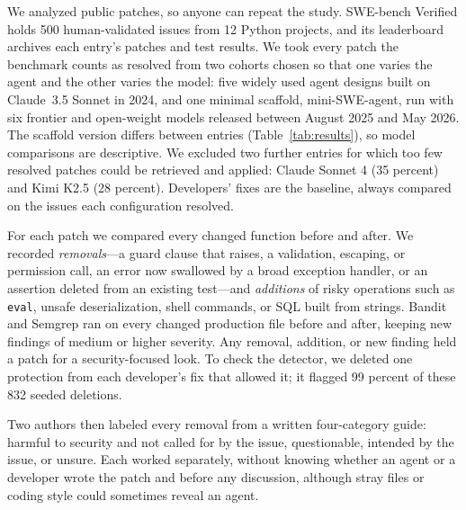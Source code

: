 \documentclass[10pt,journal,compsoc]{IEEEtran}
\begin{document}
We analyzed public patches, so anyone can repeat the study. SWE-bench Verified
holds 500 human-validated issues from 12 Python projects,\cite{chowdhury2024verified}
and its leaderboard archives each entry's patches and test results.\cite{swebench2026experiments}
We took every patch the benchmark counts as resolved from two cohorts chosen so
that one varies the agent and the other varies the model: five widely used
agent designs built on Claude~3.5 Sonnet in 2024, and one minimal scaffold,
mini-SWE-agent,\cite{yang2024sweagent} run with six frontier and open-weight
models released between August 2025 and May 2026. The scaffold version differs
between entries (Table~\ref{tab:results}), so model comparisons are descriptive.
We excluded two further entries for which too few resolved patches could be
retrieved and applied: Claude Sonnet 4 (35 percent) and Kimi K2.5 (28 percent).
Developers' fixes are the baseline, always compared on the issues each
configuration resolved.

For each patch we compared every changed function before and after. We recorded
\emph{removals}---a guard clause that raises, a validation, escaping, or
permission call, an error now swallowed by a broad exception handler, or an
assertion deleted from an existing test---and \emph{additions} of risky
operations such as \texttt{eval}, unsafe deserialization, shell commands, or SQL
built from strings. Bandit and Semgrep ran on every changed production file
before and after, keeping new findings of medium or higher severity. Any
removal, addition, or new finding held a patch for a security-focused look. To
check the detector, we deleted one protection from each developer's fix that
allowed it; it flagged 99 percent of these 832 seeded deletions.

Two authors then labeled every removal from a written four-category guide:
harmful to security and not called for by the issue, questionable, intended by
the issue, or unsure. Each worked separately, without knowing whether an agent
or a developer wrote the patch and before any discussion, although stray files
or coding style could sometimes reveal an agent.
\end{document}
